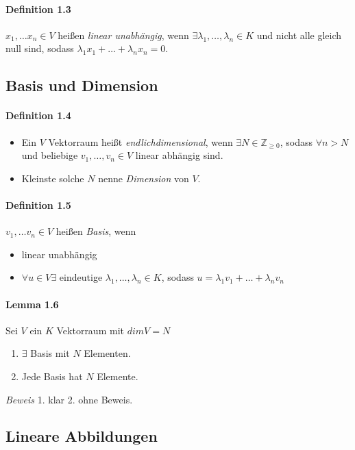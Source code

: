 \documentclass{scrartcl}
\begin{document}
\paragraph{Definition 1.3}
$x_1, \dots x_n \in V$ heißen \textit{linear unabhängig}, wenn
$\exists \lambda_1, \dots, \lambda_n \in K$ und nicht alle gleich null sind,
sodass $\lambda_1x_1 + \dots + \lambda_nx_n = 0$.

\subsection{Basis und Dimension}
\label{subsec:basisunddimension}

\paragraph{Definition 1.4}
\begin{itemize}
\item Ein $V$ Vektorraum heißt \textit{endlichdimensional}, wenn $\exists N \in
\mathbb{Z}_{\geq0}$, sodass $\forall n > N$ und beliebige $v_1, \dots, v_n \in
V$ linear abhängig sind.
\item Kleinste solche $N$ nenne \textit{Dimension} von $V$.
\end{itemize}

\paragraph{Definition 1.5}
$v_1, \dots v_n \in V$ heißen \textit{Basis}, wenn
\begin{itemize}
\item linear unabhängig
\item $\forall u \in V \exists$ eindeutige $\lambda_1, \dots, \lambda_n \in K$,
  sodass $u = \lambda_1v_1 + \dots + \lambda_nv_n$
\end{itemize}

\paragraph{Lemma 1.6}
Sei $V$ ein $K$ Vektorraum mit $dimV = N$
\begin{enumerate}
\item $\exists$ Basis mit $N$ Elementen.
\item Jede Basis hat $N$ Elemente.
\end{enumerate}
\textit{Beweis} 1. klar 2. ohne Beweis. 

\subsection{Lineare Abbildungen}
\label{subsec:lineareabbildungen}
\end{document}
